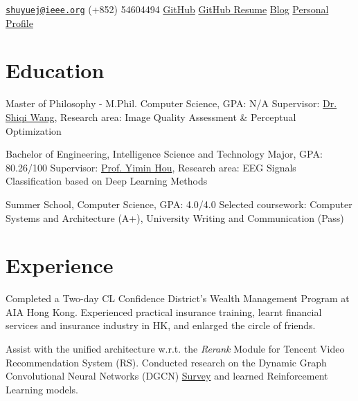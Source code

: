 \documentclass{my_cv}
\begin{document}
\hspace*{\fill}


\hspace*{\fill}

\longcontact
{\href{mailto:shuyuej@ieee.org}{\nolinkurl{shuyuej@ieee.org}}}
{(+852) 54604494}
{\href{https://github.com/SuperBruceJia}{GitHub}}
{\href{https://resume.github.io/?SuperBruceJia}{GitHub Resume}}
{\href{http://shuyuej.com/blog}{Blog}}
{\href{https://shuyuej.com/}{Personal Profile}}

\hspace*{\fill} 

\section{Education}
\workitemstwo
{Master of Philosophy - M.Phil. Computer Science, GPA: N/A}
{Supervisor: \href{mailto:shiqwang@cityu.edu.hk}{Dr. Shiqi Wang}, Research area: Image Quality Assessment \& Perceptual Optimization}

\workitemstwo
{Bachelor of Engineering, Intelligence Science and Technology Major, GPA: 80.26/100}
{Supervisor: \href{mailto:ymh7821@163.com}{Prof. Yimin Hou}, Research area: EEG Signals Classification based on Deep Learning Methods}

\workitemstwo
{Summer School, Computer Science, GPA: 4.0/4.0}
{Selected coursework: Computer Systems and Architecture (A+), University Writing and Communication (Pass)}

\hspace*{\fill} 

\section{Experience}
\workitemstwo
{Completed a Two-day CL Confidence District's Wealth Management Program at AIA Hong Kong.}
{Experienced practical insurance training, learnt financial services and insurance industry in HK, and enlarged the circle of friends.}

\workitemstwo
{Assist with the unified architecture w.r.t. the \emph{Rerank} Module for Tencent Video Recommendation System (RS).}
{Conducted research on the Dynamic Graph Convolutional Neural Networks (DGCN) \href{https://shuyuej.com/files/Dynamic-GCN-Survey.pdf}{Survey} and learned Reinforcement Learning models.}
\end{document}
